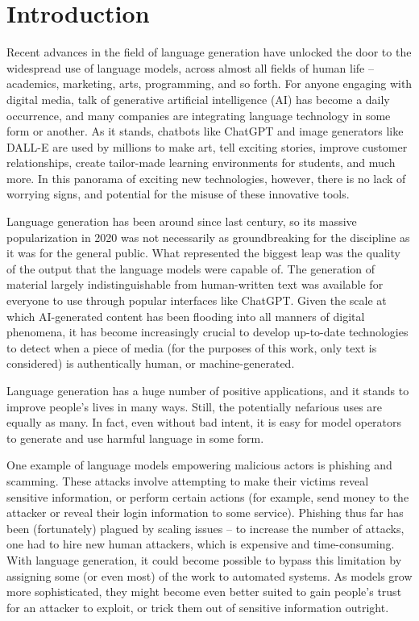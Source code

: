 \section{Introduction}
\label{sec:introduction}

Recent advances in the field of language generation have unlocked the door to the widespread use of language models, across almost all fields of human life -- academics, marketing, arts, programming, and so forth.
For anyone engaging with digital media, talk of generative artificial intelligence (AI) has become a daily occurrence, and many companies are integrating language technology in some form or another.
As it stands, chatbots like ChatGPT \citep{openai_chatgpt} and image generators like DALL-E \citep{ramesh2021zero} are used by millions to make art, tell exciting stories, improve customer relationships, create tailor-made learning environments for students, and much more.
In this panorama of exciting new technologies, however, there is no lack of worrying signs, and potential for the misuse of these innovative tools.

Language generation has been around since last century, so its massive popularization in 2020 was not necessarily as groundbreaking for the discipline as it was for the general public.
What represented the biggest leap was the quality of the output that the language models were capable of.
The generation of material largely indistinguishable from human-written text was available for everyone to use through popular interfaces like ChatGPT.
Given the scale at which AI-generated content has been flooding into all manners of digital phenomena, it has become increasingly crucial to develop up-to-date technologies to detect when a piece of media (for the purposes of this work, only text is considered) is authentically human, or machine-generated.

Language generation has a huge number of positive applications, and it stands to improve people's lives in many ways. Still, the potentially nefarious uses are equally as many.
In fact, even without bad intent, it is easy for model operators to generate and use harmful language in some form.

One example of language models empowering malicious actors is phishing and scamming.
These attacks involve attempting to make their victims reveal sensitive information, or perform certain actions (for example, send money to the attacker or reveal their login information to some service).
Phishing thus far has been (fortunately) plagued by scaling issues -- to increase the number of attacks, one had to hire new human attackers, which is expensive and time-consuming.
With language generation, it could become possible to bypass this limitation by assigning some (or even most) of the work to automated systems.
As models grow more sophisticated, they might become even better suited to gain people's trust for an attacker to exploit, or trick them out of sensitive information outright.

